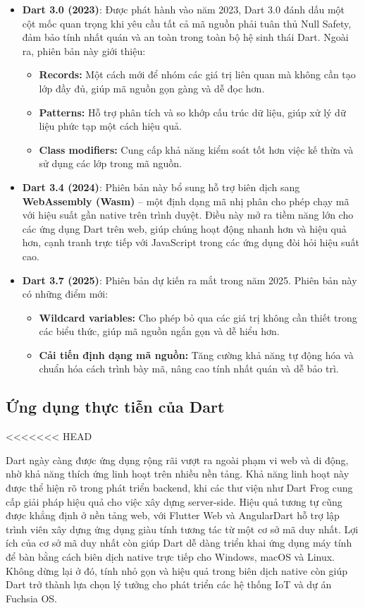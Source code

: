 \documentclass[../DoAn.tex]{subfiles}
\numberwithin{figure}{chapter}
\begin{document}
\begin{itemize}
    \item \textbf{Dart 3.0 (2023)}: Được phát hành vào năm 2023, Dart 3.0 đánh dấu một cột mốc quan trọng khi yêu cầu tất cả mã nguồn phải tuân thủ Null Safety, đảm bảo tính nhất quán và an toàn trong toàn bộ hệ sinh thái Dart. Ngoài ra, phiên bản này giới thiệu:
    \begin{itemize}
        \item \textbf{Records: } Một cách mới để nhóm các giá trị liên quan mà không cần tạo lớp đầy đủ, giúp mã nguồn gọn gàng và dễ đọc hơn.
        \item \textbf{Patterns: } Hỗ trợ phân tích và so khớp cấu trúc dữ liệu, giúp xử lý dữ liệu phức tạp một cách hiệu quả.
        \item \textbf{Class modifiers: } Cung cấp khả năng kiểm soát tốt hơn việc kế thừa và sử dụng các lớp trong mã nguồn.
    \end{itemize}
    
    \item \textbf{Dart 3.4 (2024)}: Phiên bản này bổ sung hỗ trợ biên dịch sang \textbf{WebAssembly (Wasm)} – một định dạng mã nhị phân cho phép chạy mã với hiệu suất gần native trên trình duyệt. Điều này mở ra tiềm năng lớn cho các ứng dụng Dart trên web, giúp chúng hoạt động nhanh hơn và hiệu quả hơn, cạnh tranh trực tiếp với JavaScript trong các ứng dụng đòi hỏi hiệu suất cao.
    \item \textbf{Dart 3.7 (2025)}: Phiên bản dự kiến ra mắt trong năm 2025. Phiên bản này có những điểm mới:
    \begin{itemize}
        \item \textbf{Wildcard variables:} Cho phép bỏ qua các giá trị không cần thiết trong các biểu thức, giúp mã nguồn ngắn gọn và dễ hiểu hơn.
        \item \textbf{Cải tiến định dạng mã nguồn:} Tăng cường khả năng tự động hóa và chuẩn hóa cách trình bày mã, nâng cao tính nhất quán và dễ bảo trì.
    \end{itemize}
\end{itemize}

\subsection{Ứng dụng thực tiễn của Dart}
<<<<<<< HEAD

Dart ngày càng được ứng dụng rộng rãi vượt ra ngoài phạm vi web và di động, nhờ khả năng thích ứng linh hoạt trên nhiều nền tảng. Khả năng linh hoạt này được thể hiện rõ trong phát triển backend, khi các thư viện như Dart Frog cung cấp giải pháp hiệu quả cho việc xây dựng server-side. Hiệu quả tương tự cũng được khẳng định ở nền tảng web, với Flutter Web và AngularDart hỗ trợ lập trình viên xây dựng ứng dụng giàu tính tương tác từ một cơ sở mã duy nhất. Lợi ích của cơ sở mã duy nhất còn giúp Dart dễ dàng triển khai ứng dụng máy tính để bàn bằng cách biên dịch native trực tiếp cho Windows, macOS và Linux. Không dừng lại ở đó, tính nhỏ gọn và hiệu quả trong biên dịch native còn giúp Dart trở thành lựa chọn lý tưởng cho phát triển các hệ thống IoT và dự án Fuchsia OS.
\end{document}
